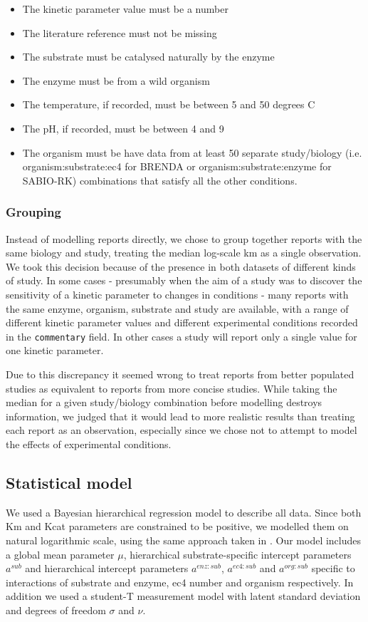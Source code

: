 \documentclass[11pt]{article}
\begin{document}
\begin{itemize}
\item The kinetic parameter value must be a number
\item The literature reference must not be missing
\item The substrate must be catalysed naturally by the enzyme
\item The enzyme must be from a wild organism
\item The temperature, if recorded, must be between 5 and 50 degrees C
\item The pH, if recorded, must be between 4 and 9
\item The organism must be have data from at least 50 separate study/biology
(i.e. organism:substrate:ec4 for BRENDA or organism:substrate:enzyme for
SABIO-RK) combinations that satisfy all the other conditions.
\end{itemize}

\subsubsection{Grouping}
\label{sec:orgc5b09e3}
Instead of modelling reports directly, we chose to group together reports with
the same biology and study, treating the median log-scale km as a single
observation. We took this decision because of the presence in both datasets of
different kinds of study. In some cases - presumably when the aim of a study was
to discover the sensitivity of a kinetic parameter to changes in conditions -
many reports with the same enzyme, organism, substrate and study are available,
with a range of different kinetic parameter values and different experimental
conditions recorded in the \texttt{commentary} field. In other cases a study will
report only a single value for one kinetic parameter.

Due to this discrepancy it seemed wrong to treat reports from better populated
studies as equivalent to reports from more concise studies. While taking the
median for a given study/biology combination before modelling destroys
information, we judged that it would lead to more realistic results than
treating each report as an observation, especially since we chose not to
attempt to model the effects of experimental conditions.

\subsection{Statistical model}
\label{sec:org9e76746}
We used a Bayesian hierarchical regression model to describe all data. Since
both Km and Kcat parameters are constrained to be positive, we modelled them on
natural logarithmic scale, using the same approach taken in . Our model includes a global mean
parameter \(\mu\), hierarchical substrate-specific intercept parameters \(a^{sub}\)
and hierarchical intercept parameters \(a^{enz:sub}\), \(a^{ec4:sub}\) and
\(a^{org:sub}\) specific to interactions of substrate and enzyme, ec4 number and
organism respectively. In addition we used a student-T measurement model with
latent standard deviation and degrees of freedom \(\sigma\) and \(\nu\).
\end{document}
